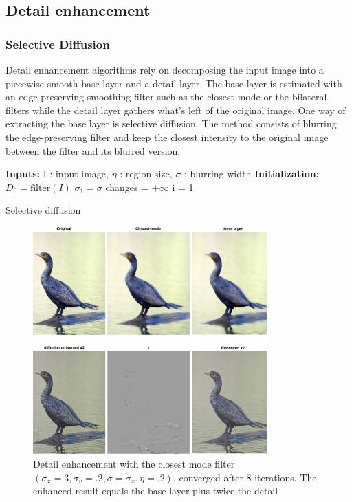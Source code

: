 \documentclass{acmsiggraph}
\begin{document}
\subsection{Detail enhancement}
\subsubsection{Selective Diffusion}
Detail enhancement algorithms rely on decomposing the input image into a piecewise-smooth base layer and a detail layer. The base layer is estimated with an edge-preserving smoothing filter such as the closest mode or the bilateral filters while the detail layer gathers what's left of the original image.
One way of extracting the base layer is selective diffusion. The method consists of blurring the edge-preserving filter and keep the closest intensity to the original image between the filter and its blurred version.
\begin{algorithm}
\DontPrintSemicolon
  \textbf{Inputs:} I : input image, $\eta$ : region size, $\sigma$ : blurring width \;
 \textbf{Initialization:}\;
 $D_0 = \text{filter}(I)$\;
 $\sigma_1 = \sigma$\;
 changes = $+\infty$\;
 i = 1\;
 \While{changes  $\neq 0$}{
  $B_i = D_{i-1}\otimes G(\sigma_i)$\;
  \tcc{local deviation of the unblurred version}
  $E_u = (D_{i-1} - I)^2\otimes G(\eta \sigma_i)$\;
  \tcc{local deviation of the blurred version}
  $E_b = (B_i - I)^2\otimes G(\eta \sigma_i)$\;
  $R = E_b / E_u$\;
  $B = \begin{cases}
  B_i \phantom{iiiiiiiiiiiiiiiiiiiiiiiiiiiiiiiiiii} R<.5\\
  2(R-\frac{1}{2})(D_{i-1}-B_i)+B_i \phantom{iiii} R\in[.5,1)\\
  D_{i-1} \phantom{iiiiiiiiiiiiiiiiiiiiiiiiiiiiiii} R\geq 1
  \end{cases}$\;
  i ++ \;
  $changes = numel(R<1)$\;
  $\sigma_i = \sqrt 2\sigma_i$\;
 }
\caption{Selective diffusion}
\end{algorithm}
\begin{figure}
\centering
\includegraphics[width=9cm]{cormorant}
\caption{Detail enhancement with the closest mode filter \\$(\sigma_x=3,\sigma_v=.2,\sigma=\sigma_x,\eta=.2)$, converged after 8 iterations. The enhanced result equals the base layer plus twice the detail}
\end{figure}
\end{document}
